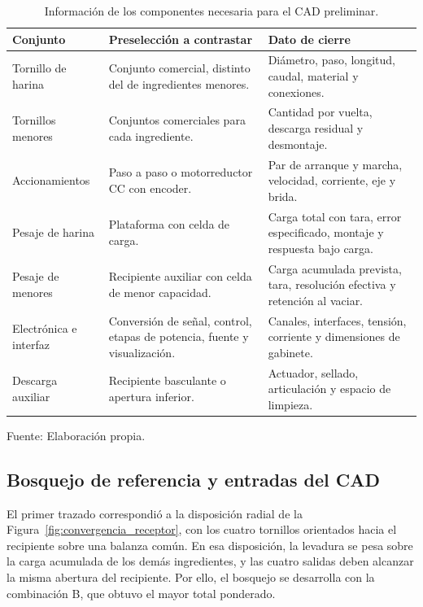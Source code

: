 \begin{table}[H]
    \centering
    \caption{Información de los componentes necesaria para el CAD preliminar.}
    \label{tab:preseleccion_cad}
    \footnotesize
    \renewcommand{\arraystretch}{1.2}
    \begin{tabularx}{\textwidth}{p{}XX}
        \toprule
        \textbf{Conjunto} & \textbf{Preselección a contrastar} & \textbf{Dato de cierre} \\
        \midrule
        Tornillo de harina & Conjunto comercial, distinto del de ingredientes menores. & Diámetro, paso, longitud, caudal, material y conexiones. \\
        Tornillos menores & Conjuntos comerciales para cada ingrediente. & Cantidad por vuelta, descarga residual y desmontaje. \\
        Accionamientos & Paso a paso o motorreductor CC con encoder. & Par de arranque y marcha, velocidad, corriente, eje y brida. \\
        Pesaje de harina & Plataforma con celda de carga. & Carga total con tara, error especificado, montaje y respuesta bajo carga. \\
        Pesaje de menores & Recipiente auxiliar con celda de menor capacidad. & Carga acumulada prevista, tara, resolución efectiva y retención al vaciar. \\
        Electrónica e interfaz & Conversión de señal, control, etapas de potencia, fuente y visualización. & Canales, interfaces, tensión, corriente y dimensiones de gabinete. \\
        Descarga auxiliar & Recipiente basculante o apertura inferior. & Actuador, sellado, articulación y espacio de limpieza. \\
        \bottomrule
    \end{tabularx}
    \par\smallskip
    Fuente: Elaboración propia.
\end{table}

\subsection{Bosquejo de referencia y entradas del CAD}

El primer trazado correspondió a la disposición radial de la
Figura~\ref{fig:convergencia_receptor}, con los cuatro tornillos
orientados hacia el recipiente sobre una balanza común. En esa
disposición, la levadura se pesa sobre la carga acumulada de los demás
ingredientes, y las cuatro salidas deben alcanzar la misma abertura del
recipiente. Por ello, el bosquejo se desarrolla con la combinación B,
que obtuvo el mayor total ponderado.

